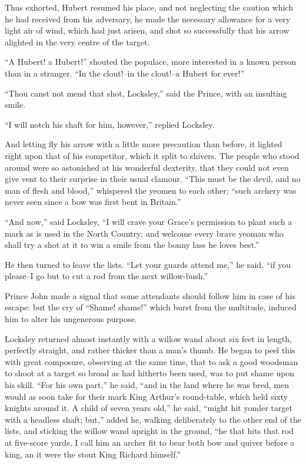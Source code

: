 Thus exhorted, Hubert resumed his place, and not neglecting the caution
which he had received from his adversary, he made the necessary
allowance for a very light air of wind, which had just arisen, and shot
so successfully that his arrow alighted in the very centre of the
target.

``A Hubert! a Hubert!'' shouted the populace, more interested in a known
person than in a stranger. ``In the clout!--in the clout!--a Hubert for
ever!''

``Thou canst not mend that shot, Locksley,'' said the Prince, with an
insulting smile.

``I will notch his shaft for him, however,'' replied Locksley.

And letting fly his arrow with a little more precaution than before, it
lighted right upon that of his competitor, which it split to shivers.
The people who stood around were so astonished at his wonderful
dexterity, that they could not even give vent to their surprise in their
usual clamour. ``This must be the devil, and no man of flesh and
blood,'' whispered the yeomen to each other; ``such archery was never
seen since a bow was first bent in Britain.''

``And now,'' said Locksley, ``I will crave your Grace's permission to
plant such a mark as is used in the North Country; and welcome every
brave yeoman who shall try a shot at it to win a smile from the bonny
lass he loves best.''

He then turned to leave the lists. ``Let your guards attend me,'' he
said, ``if you please--I go but to cut a rod from the next
willow-bush.''

Prince John made a signal that some attendants should follow him in case
of his escape: but the cry of ``Shame! shame!'' which burst from the
multitude, induced him to alter his ungenerous purpose.

Locksley returned almost instantly with a willow wand about six feet in
length, perfectly straight, and rather thicker than a man's thumb. He
began to peel this with great composure, observing at the same time,
that to ask a good woodsman to shoot at a target so broad as had
hitherto been used, was to put shame upon his skill. ``For his own
part,'' he said, ``and in the land where he was bred, men would as soon
take for their mark King Arthur's round-table, which held sixty knights
around it. A child of seven years old,'' he said, ``might hit yonder
target with a headless shaft; but,'' added he, walking deliberately to
the other end of the lists, and sticking the willow wand upright in the
ground, ``he that hits that rod at five-score yards, I call him an
archer fit to bear both bow and quiver before a king, an it were the
stout King Richard himself.''

